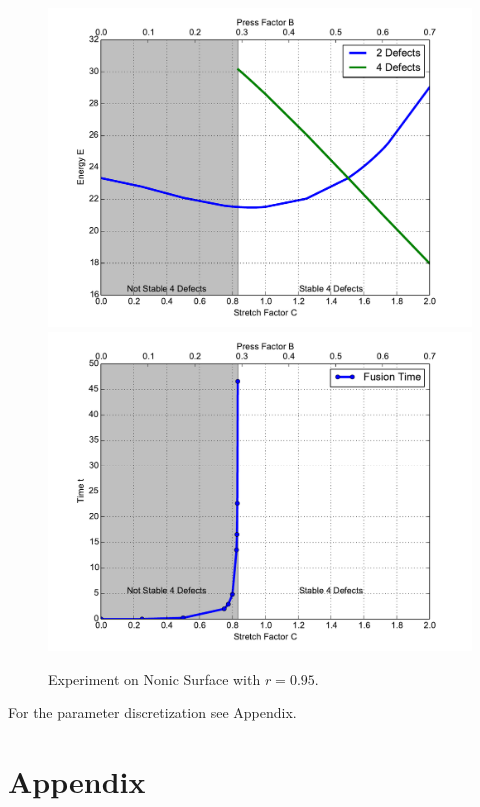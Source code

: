 \documentclass[a4paper,11pt]{scrartcl}
\newcommand{\pprop}{r}
\begin{document}
\begin{figure}
  \centering
  \includegraphics[width=.95\textwidth]{stuff/StretchEnergyPlot.pdf}
  \includegraphics[width=.95\textwidth]{stuff/StretchTimePlot.pdf}
  \caption{Experiment on Nonic Surface with \( \pprop = 0.95 \). 
           }
  \label{fig:SurfaceSequencePlots}
\end{figure}
For the parameter discretization see Appendix. 





\section{Appendix}
\end{document}
